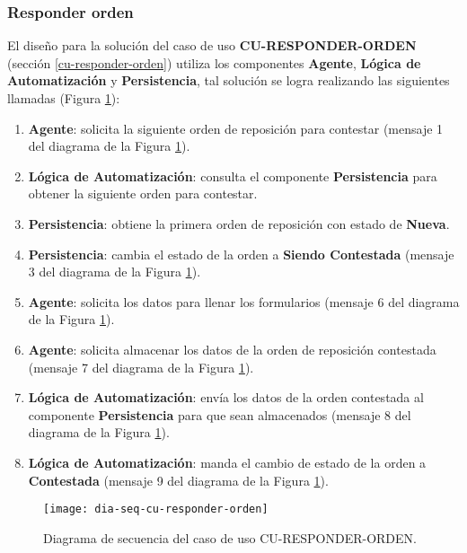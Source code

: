 \subsubsection{Responder orden}
El diseño para la solución del caso de uso \textbf{CU-RESPONDER-ORDEN} (sección \ref{cu-responder-orden}) utiliza los componentes \textbf{Agente}, \textbf{Lógica de Automatización} y \textbf{Persistencia}, tal solución se logra realizando las siguientes llamadas (Figura \ref{fig:dia-seq-cu-responder-orden}):
\begin{enumerate}
	\item \textbf{Agente}: solicita la siguiente orden de reposición para contestar (mensaje 1 del diagrama de la Figura \ref{fig:dia-seq-cu-responder-orden}).
	\item \textbf{Lógica de Automatización}: consulta el componente \textbf{Persistencia} para obtener la siguiente orden para contestar.
	\item \textbf{Persistencia}: obtiene la primera orden de reposición con estado de \textbf{Nueva}.
	\item \textbf{Persistencia}: cambia el estado de la orden a \textbf{Siendo Contestada} (mensaje 3 del diagrama de la Figura \ref{fig:dia-seq-cu-responder-orden}).
	\item \textbf{Agente}: solicita los datos para llenar los formularios (mensaje 6 del diagrama de la Figura \ref{fig:dia-seq-cu-responder-orden}).
	\item \textbf{Agente}: solicita almacenar los datos de la orden de reposición contestada (mensaje 7 del diagrama de la Figura \ref{fig:dia-seq-cu-responder-orden}).
	\item \textbf{Lógica de Automatización}: envía los datos de la orden contestada al componente \textbf{Persistencia} para que sean almacenados (mensaje 8 del diagrama de la Figura \ref{fig:dia-seq-cu-responder-orden}).
	\item \textbf{Lógica de Automatización}: manda el cambio de estado de la orden a \textbf{Contestada} (mensaje 9 del diagrama de la Figura \ref{fig:dia-seq-cu-responder-orden}).
\end{enumerate}

\begin{figure}[h]
	\centering
	\texttt{[image: dia-seq-cu-responder-orden]}
	\caption{Diagrama de secuencia del caso de uso CU-RESPONDER-ORDEN.}
	\label{fig:dia-seq-cu-responder-orden}
\end{figure}


